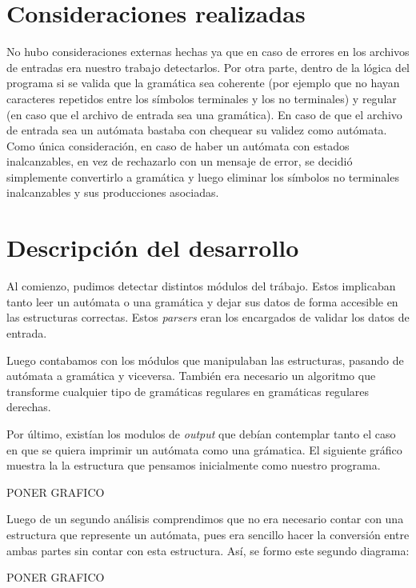 \documentclass[a4paper,10pt]{article}
\begin{document}
\section{Consideraciones realizadas}
    No hubo consideraciones externas hechas ya que en caso de errores en los archivos de entradas era nuestro trabajo
     detectarlos. Por otra parte, dentro de la lógica del programa si se valida que la gramática sea coherente 
      (por ejemplo que no hayan caracteres repetidos entre los símbolos terminales y los no terminales) y regular
      (en caso que el archivo de entrada sea una gramática). En caso de que el archivo de entrada sea un autómata
      bastaba con chequear su validez como autómata. \\
Como única consideración, en caso de haber un autómata con estados inalcanzables, en vez de rechazarlo con un mensaje de error, 
se decidió simplemente convertirlo a gramática y luego eliminar los símbolos no terminales inalcanzables y sus producciones asociadas.

\newpage

\section{Descripción del desarrollo}
    Al comienzo, pudimos detectar distintos módulos del trábajo. Estos implicaban tanto leer un autómata o una gramática
     y dejar sus datos de forma accesible en las estructuras correctas. Estos \textit{parsers} eran los encargados
      de validar los datos de entrada.
      
      Luego contabamos con los módulos que manipulaban las estructuras, pasando de autómata a gramática y viceversa.
      También era necesario un algoritmo que transforme cualquier tipo de gramáticas regulares en gramáticas 
       regulares derechas.

      Por último, existían los modulos de \textit{output} que debían contemplar tanto el caso en que se quiera imprimir
       un autómata como una grámatica.
      El siguiente gráfico muestra la la estructura que pensamos inicialmente como nuestro programa.

      PONER GRAFICO

      Luego de un segundo análisis comprendimos que no era necesario contar con una estructura que represente
       un autómata, pues era sencillo hacer la conversión entre ambas partes sin contar con esta estructura.
      Así, se formo este segundo diagrama:

      PONER GRAFICO
\end{document}
